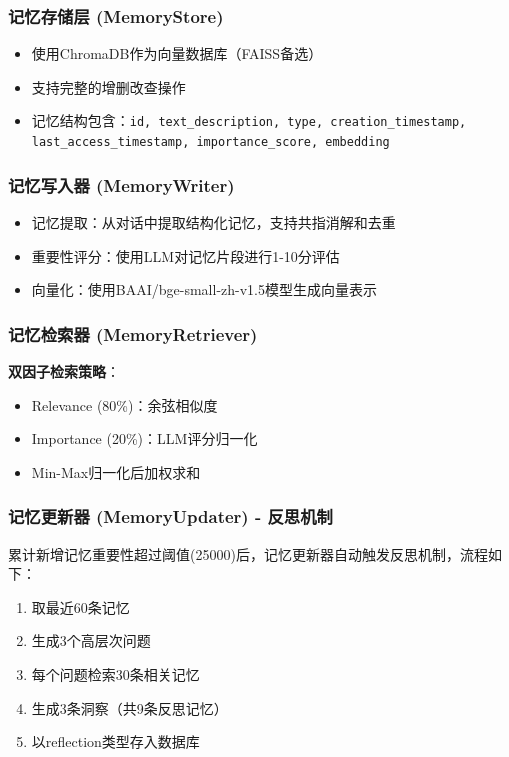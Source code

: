 \documentclass[11pt]{article}
\begin{document}
\subsubsection{记忆存储层 (MemoryStore)}
\begin{itemize}
    \item 使用ChromaDB作为向量数据库（FAISS备选）
    \item 支持完整的增删改查操作
    \item 记忆结构包含：\texttt{id, text\_description, type, creation\_timestamp, last\_access\_timestamp, importance\_score, embedding}
\end{itemize}

\subsubsection{记忆写入器 (MemoryWriter)}
\begin{itemize}
    \item 记忆提取：从对话中提取结构化记忆，支持共指消解和去重
    \item 重要性评分：使用LLM对记忆片段进行1-10分评估
    \item 向量化：使用BAAI/bge-small-zh-v1.5模型生成向量表示
\end{itemize}

\subsubsection{记忆检索器 (MemoryRetriever)}
\textbf{双因子检索策略}：
\begin{itemize}
    \item Relevance (80\%)：余弦相似度
    \item Importance (20\%)：LLM评分归一化
    \item Min-Max归一化后加权求和
\end{itemize}

\subsubsection{记忆更新器 (MemoryUpdater) - 反思机制}
累计新增记忆重要性超过阈值(25000)后，记忆更新器自动触发反思机制，流程如下：
\begin{enumerate}
    \item 取最近60条记忆
    \item 生成3个高层次问题
    \item 每个问题检索30条相关记忆
    \item 生成3条洞察（共9条反思记忆）
    \item 以reflection类型存入数据库
\end{enumerate}
\end{document}
